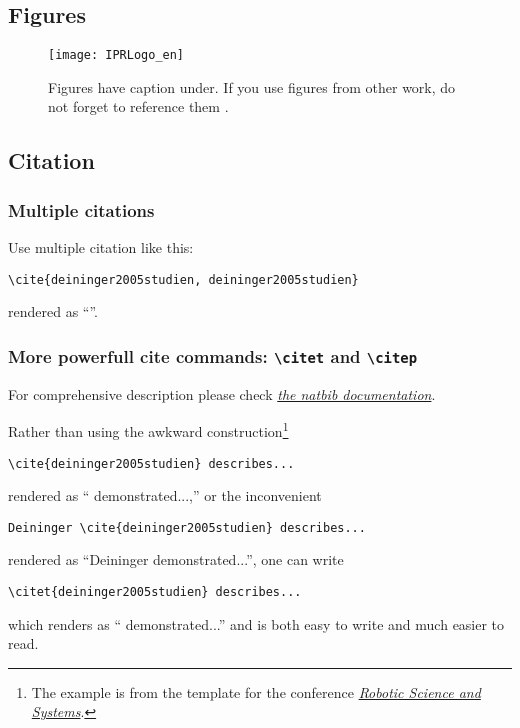 \subsection{Figures}
\begin{figure}[H]
    \centering
    \texttt{[image: IPRLogo\_en]}
    \caption{Figures have caption under. If you use figures from other work, do not forget to reference them \cite{deininger2005studien}.}
    \label{fig:figure_caption}
\end{figure}

\subsection{Citation}

\subsubsection{Multiple citations}
Use multiple citation like this:
{\small
\begin{verbatim}
\cite{deininger2005studien, deininger2005studien}
\end{verbatim}
}
rendered as ``\cite{deininger2005studien, deininger2005studien}''.


\subsubsection{More powerfull cite commands: \texttt{\textbackslash citet} and \texttt{\textbackslash citep}}
For comprehensive description please check \href{http://merkel.texture.rocks/Latex/natbib.php}{\textit{the natbib documentation}}.

Rather than using the awkward construction\footnote{The example is from the template for the conference \href{http://www.roboticsconference.org/information/authorinfo/}{\textit{Robotic Science and Systems}}.}
{\small
\begin{verbatim}
\cite{deininger2005studien} describes...
\end{verbatim}
}
\noindent
rendered as ``\cite{deininger2005studien} demonstrated...,'' or the inconvenient
{\small
\begin{verbatim}
Deininger \cite{deininger2005studien} describes...
\end{verbatim}
}
\noindent
rendered as ``Deininger \cite{deininger2005studien} demonstrated...'', one can write
{\small
\begin{verbatim}
\citet{deininger2005studien} describes...
\end{verbatim}
}
\noindent
which renders as ``\citet{deininger2005studien} demonstrated...'' and is
both easy to write and much easier to read.


